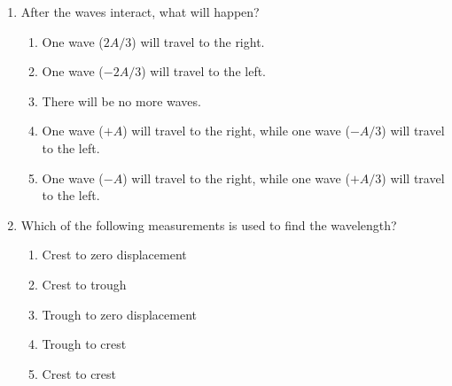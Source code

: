 \documentclass{../../../oss-classkick}
\begin{document}
\begin{multicols}{2}
\begin{enumerate}[leftmargin=18pt,resume]
  \item After the waves interact, what will happen?
    \label{des2}
    \begin{enumerate}[nosep,leftmargin=18pt,label=(\Alph*)]
    \item One wave ($2A/3$) will travel to the right.
    \item One wave ($-2A/3$) will travel to the left.
    \item There will be no more waves.
    \item One wave ($+A$) will travel to the right, while one wave ($-A/3$)
      will travel to the left.
    \item One wave ($-A$) will travel to the right, while one wave ($+A/3$)
      will travel to the left.
    \end{enumerate}
    
    
    


  \item Which of the following measurements is used to find the wavelength?
    \begin{enumerate}[nosep,leftmargin=18pt,label=(\Alph*)]
    \item Crest to zero displacement
    \item Crest to trough
    \item Trough to zero displacement
    \item Trough to crest
    \item Crest to crest
    \end{enumerate}
    \vspace{.7in}
    

\end{enumerate}
\end{multicols}
\end{document}

